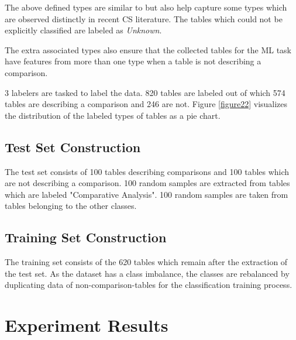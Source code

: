 The above defined types are similar to \cite{kim2012scientific} but also help capture some types which are observed distinctly in recent CS literature. The tables which could not be explicitly classified are labeled as \textit{Unknown}. 

The extra associated types also ensure that the collected tables for the ML task have features from more than one type when a table is not describing a comparison. 

3 labelers are tasked to label the data. 820 tables are labeled out of which 574 tables are describing a comparison and 246 are not. Figure \ref{figure22} visualizes the distribution of the labeled types of tables as a pie chart. 

\subsection{Test Set Construction}
\label{table_classification:data-coll:test}
The test set consists of 100 tables describing comparisons and 100 tables which are not describing a comparison. 100 random samples are extracted from tables which are labeled "Comparative Analysis". 100 random samples are taken from tables belonging to the other classes. 

\subsection{Training Set Construction}
The training set consists of the 620 tables which remain after the extraction of the test set. As the dataset has a class imbalance, the classes are rebalanced by duplicating data of non-comparison-tables for the classification training process. 

\section{Experiment Results}
\label{table_classification:experiment-result}

